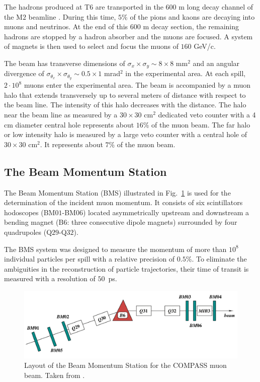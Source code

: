 The hadrons produced at T$6$ are transported in the $600$ m long decay channel of the M$2$ beamline \cite{NIM2015,M2Beam}. During this time, $5$\% of the pions and kaons are decaying into muons and neutrinos. At the end of this $600$ m decay section, the remaining hadrons are stopped by a hadron absorber and the muons are focused. A system of magnets is then used to select and focus the muons of $160$ GeV/c.

The beam has transverse dimensions of $\sigma_x \times \sigma_y \sim 8 \times 8 $ mm$^2$ and an angular divergence of $\sigma_{\theta_x} \times \sigma_{\theta_y} \sim 0.5 \times 1 $ mrad$^2$ in the experimental area. At each spill, $2\cdot10^8$ muons enter the experimental area. The beam is accompanied by a muon halo that extends transversely up to several meters of distance with respect to the beam line. The intensity of this halo decreases with the distance. The halo near the beam line as measured by a $30 \times 30$ cm$^2$ dedicated veto counter with a 4 cm diameter central hole represents about $16$\% of the muon beam. The far halo or low intensity halo is measured by a large veto counter with a central hole of $30 \times 30$ cm$^2$. It represents about $7$\% of the muon beam.

\subsection{The Beam Momentum Station}

The Beam Momentum Station (BMS) illustrated in Fig.~\ref{pic:BMS} is used for the determination of the incident muon momentum. It consists of six scintillators hodoscopes (BM$01$-BM$06$) located asymmetrically upstream and downstream a bending magnet (B$6$: three consecutive dipole magnets) surrounded by four quadrupoles (Q$29$-Q$32$).

The BMS system was designed to measure the momentum of more than $10^8$ individual particles per spill with a relative precision of $0.5$\%. To eliminate the ambiguities in the reconstruction of particle trajectories, their time of transit is measured with a resolution of $50$~ps.

\begin{figure}[!h]
  \centering
	\includegraphics[scale=0.5]{./gfx/BMS.png}
	\caption{Layout of the Beam Momentum Station for the COMPASS muon beam. Taken from \cite{NIM}.}
	\label{pic:BMS}
\end{figure}

